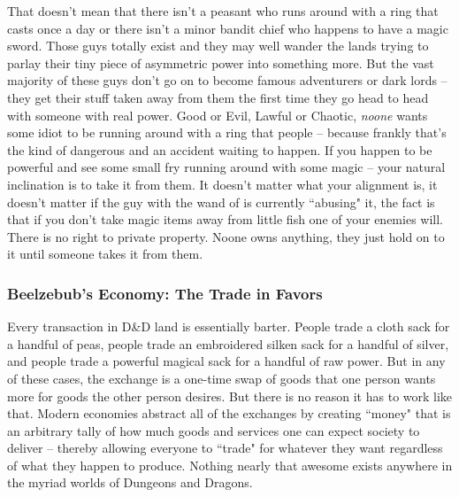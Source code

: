 That doesn't mean that there isn't a peasant who runs around with a ring that casts  once a day or there isn't a minor bandit chief who happens to have a magic sword. Those guys totally exist and they may well wander the lands trying to parlay their tiny piece of asymmetric power into something more. But the vast majority of these guys don't go on to become famous adventurers or dark lords -- they get their stuff taken away from them the first time they go head to head with someone with real power. Good or Evil, Lawful or Chaotic, \textit{noone} wants some idiot to be running around with a ring that  people -- because frankly that's the kind of dangerous and an accident waiting to happen. If you happen to be powerful and see some small fry running around with some magic -- your natural inclination is to take it from them. It doesn't matter what your alignment is, it doesn't matter if the guy with the wand of  is currently ``abusing" it, the fact is that if you don't take magic items away from little fish one of your enemies will. There is no right to private property. Noone owns anything, they just hold on to it until someone takes it from them.

\subsubsection{Beelzebub's Economy: The Trade in Favors}
\vspace*{-8pt}

Every transaction in D\&D land is essentially barter. People trade a cloth sack for a handful of peas, people trade an embroidered silken sack for a handful of silver, and people trade a powerful magical sack for a handful of raw power. But in any of these cases, the exchange is a one-time swap of goods that one person wants more for goods the other person desires. But there is no reason it has to work like that. Modern economies abstract all of the exchanges by creating ``money" that is an arbitrary tally of how much goods and services one can expect society to deliver -- thereby allowing everyone to ``trade" for whatever they want regardless of what they happen to produce. Nothing nearly that awesome exists anywhere in the myriad worlds of Dungeons and Dragons.


